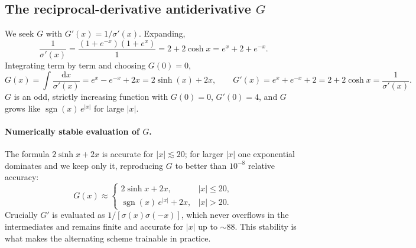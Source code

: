 \documentclass[11pt]{article}
\newcommand{\dd}{\mathrm{d}}
\begin{document}
\subsection{The reciprocal-derivative antiderivative $G$}
\label{sec:G}
We seek $G$ with $G'(x)=1/\sigma'(x)$. Expanding,
\begin{equation}
  \frac{1}{\sigma'(x)}=\frac{(1+e^{-x})(1+e^{x})}{1}
   = 2+2\cosh x = e^{x}+2+e^{-x}.
\end{equation}
Integrating term by term and choosing $G(0)=0$,
\begin{equation}
  G(x)=\int \frac{\dd x}{\sigma'(x)} = e^{x}-e^{-x}+2x
       = 2\sinh(x)+2x,
  \qquad
  G'(x)=e^{x}+e^{-x}+2=2+2\cosh x=\frac{1}{\sigma'(x)}.
\end{equation}
$G$ is an odd, strictly increasing function with $G(0)=0$, $G'(0)=4$, and
$G$ grows like $\operatorname{sgn}(x)\,e^{|x|}$ for large $|x|$.

\paragraph{Numerically stable evaluation of $G$.}
The formula $2\sinh x+2x$ is accurate for $|x|\lesssim20$; for larger $|x|$ one
exponential dominates and we keep only it, reproducing $G$ to better than
$10^{-8}$ relative accuracy:
\begin{equation}
  G(x)\approx
  \begin{cases}
    2\sinh x+2x, & |x|\le20,\\
    \operatorname{sgn}(x)\,e^{|x|}+2x, & |x|>20.
  \end{cases}
\end{equation}
Crucially $G'$ is evaluated as $1/[\sigma(x)\sigma(-x)]$, which never overflows
in the intermediates and remains finite and accurate for $|x|$ up to $\sim88$.
This stability is what makes the alternating scheme trainable in practice.
\end{document}
